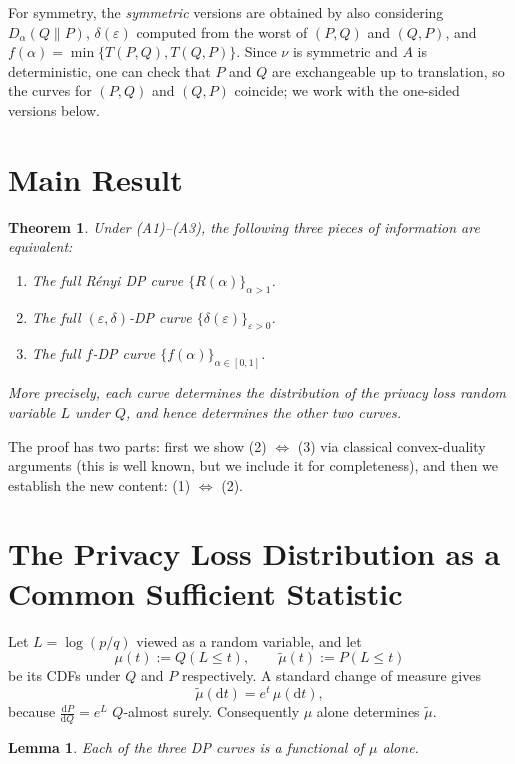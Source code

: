 \documentclass[11pt]{article}
\newtheorem{theorem}{Theorem}
\newtheorem{lemma}{Lemma}
\begin{document}
For symmetry, the \emph{symmetric} versions are obtained by also considering $D_\alpha(Q\|P)$, $\delta(\varepsilon)$ computed from the worst of $(P,Q)$ and $(Q,P)$, and $f(\alpha) = \min\{T(P,Q),T(Q,P)\}$. Since $\nu$ is symmetric and $A$ is deterministic, one can check that $P$ and $Q$ are exchangeable up to translation, so the curves for $(P,Q)$ and $(Q,P)$ coincide; we work with the one-sided versions below.

\section{Main Result}

\begin{theorem}
Under (A1)--(A3), the following three pieces of information are equivalent:
\begin{enumerate}
    \item The full R\'enyi DP curve $\{R(\alpha)\}_{\alpha>1}$.
    \item The full $(\varepsilon,\delta)$-DP curve $\{\delta(\varepsilon)\}_{\varepsilon>0}$.
    \item The full $f$-DP curve $\{f(\alpha)\}_{\alpha\in[0,1]}$.
\end{enumerate}
More precisely, each curve determines the distribution of the privacy loss random variable $L$ under $Q$, and hence determines the other two curves.
\end{theorem}

The proof has two parts: first we show (2) $\Leftrightarrow$ (3) via classical convex-duality arguments (this is well known, but we include it for completeness), and then we establish the new content: (1) $\Leftrightarrow$ (2).

\section{The Privacy Loss Distribution as a Common Sufficient Statistic}

Let $L = \log(p/q)$ viewed as a random variable, and let
\[
\mu(t) := Q(L \le t), \qquad \tilde\mu(t) := P(L \le t)
\]
be its CDFs under $Q$ and $P$ respectively. A standard change of measure gives
\begin{equation}
\tilde\mu(\mathrm{d}t) = e^{t}\,\mu(\mathrm{d}t), \tag{$\star$}
\end{equation}
because $\frac{\mathrm{d}P}{\mathrm{d}Q} = e^L$ $Q$-almost surely. Consequently $\mu$ alone determines $\tilde\mu$.

\begin{lemma}
Each of the three DP curves is a functional of $\mu$ alone.
\end{lemma}
\end{document}
